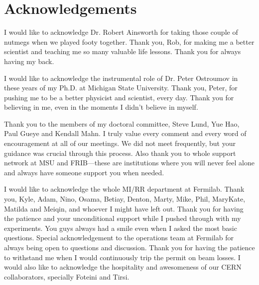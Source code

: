 \documentclass[]{msu-thesis}
\begin{document}


%
%
\clearpage
\chapter*{Acknowledgements}
\DoubleSpacing %
I would like to acknowledge Dr. Robert Ainsworth for taking those couple of nutmegs when we played footy together. Thank you, Rob, for making me a better scientist and teaching me so many valuable life lessons. Thank you for always having my back.

I would like to acknowledge the instrumental role of Dr. Peter Ostroumov in these years of my Ph.D. at Michigan State University. Thank you, Peter, for pushing me to be a better physicist and scientist, every day. Thank you for believing in me, even in the moments I didn't believe in myself.

Thank you to the members of my doctoral committee, Steve Lund, Yue Hao, Paul Gueye and Kendall Mahn. I truly value every comment and every word of encouragement at all of our meetings. We did not meet frequently, but your guidance was crucial through this process. Also thank you to whole support network at MSU and FRIB---these are institutions where you will never feel alone and always have someone support you when needed.

I would like to acknowledge the whole MI/RR department at Fermilab. Thank you, Kyle, Adam, Nino, Osama, Betiay, Denton, Marty, Mike, Phil, MaryKate, Matilda and Meiqin, and whoever I might have left out. Thank you for having the patience and your unconditional support while I pushed through with my experiments. You guys always had a smile even when I asked the most basic questions. Special acknowledgement to the operations team at Fermilab for always being open to questions and discussion. Thank you for having the patience to withstand me when I would continuously trip the permit on beam losses. I would also like to acknowledge the hospitality and awesomeness of our CERN collaborators, specially Foteini and Tirsi. 
\end{document}
